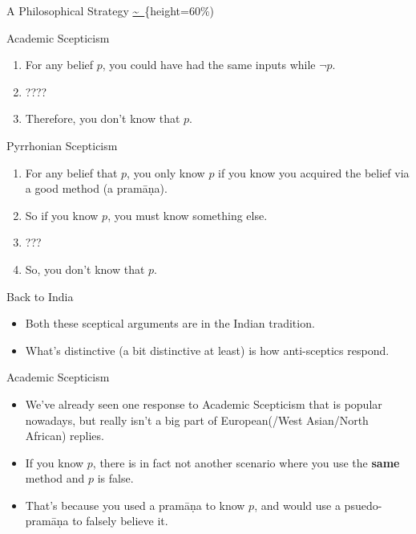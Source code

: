 \documentclass[
  17pt,
  letterpaper,
  ignorenonframetext,
  aspectratio=169,
]{beamer}
\providecommand{\tightlist}{%
  \setlength{\itemsep}{0pt}\setlength{\parskip}{0pt}}\usepackage{longtable,booktabs,array}
\begin{document}
\begin{frame}{A Philosophical Strategy}
\protect\hypertarget{a-philosophical-strategy}{}
\href{../images/underpants.jpeg}{\textasciitilde~}\{height=60\%)
\end{frame}

\begin{frame}{Academic Scepticism}
\protect\hypertarget{academic-scepticism}{}
\begin{enumerate}[<+->]
\tightlist
\item
  For any belief \(p\), you could have had the same inputs while
  \(\neg p\).
\item
  ????
\item
  Therefore, you don't know that \(p\).
\end{enumerate}
\end{frame}

\begin{frame}{Pyrrhonian Scepticism}
\protect\hypertarget{pyrrhonian-scepticism}{}
\begin{enumerate}[<+->]
\tightlist
\item
  For any belief that \(p\), you only know \(p\) if you know you
  acquired the belief via a good method (a pramāṇa).
\item
  So if you know \(p\), you must know something else.
\item
  ???
\item
  So, you don't know that \(p\).
\end{enumerate}
\end{frame}

\begin{frame}{Back to India}
\protect\hypertarget{back-to-india}{}
\begin{itemize}[<+->]
\tightlist
\item
  Both these sceptical arguments are in the Indian tradition.
\item
  What's distinctive (a bit distinctive at least) is how anti-sceptics
  respond.
\end{itemize}
\end{frame}

\begin{frame}{Academic Scepticism}
\protect\hypertarget{academic-scepticism-1}{}
\begin{itemize}[<+->]
\tightlist
\item
  We've already seen one response to Academic Scepticism that is popular
  nowadays, but really isn't a big part of European(/West Asian/North
  African) replies.
\item
  If you know \(p\), there is in fact not another scenario where you use
  the \textbf{same} method and \(p\) is false.
\item
  That's because you used a pramāṇa to know \(p\), and would use a
  psuedo-pramāṇa to falsely believe it.
\end{itemize}
\end{frame}
\end{document}
